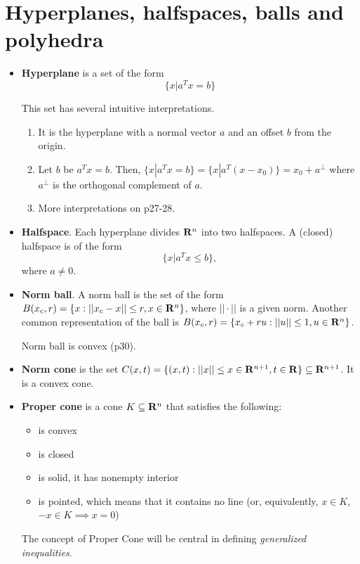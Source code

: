 \documentclass[a4paper, oneside]{book}
\begin{document}
\section{Hyperplanes, halfspaces, balls and polyhedra}
\begin{itemize}
\item \textbf{Hyperplane} is a set of the form $$\{x | a^T x = b\}$$

This set has several intuitive interpretations. 
	\begin{enumerate}
	\item It is the hyperplane with a normal vector $a$ and an offset $b$ from the origin.
	\item Let $b$ be $a^T x = b$. Then, $\{x | a^T x = b\} = \{x | a^T (x-x_0)\} = x_0 + a^\perp$ where $a^\perp$ is the orthogonal complement of $a$.
	\item More interpretations on p27-28.
	\end{enumerate}
\item \textbf{Halfspace}. Each hyperplane divides $\mathbf R^n$ into two halfspaces. A (closed) halfspace is of the form $$\{x | a^T x\le b\},$$
where $a \neq 0$.
\item \textbf{Norm ball}. A norm ball is the set of the form $B(x_c, r)=\{ x :  ||x_c-x||\le r, x\in \mathbf R^n \}$, where $||\cdot||$ is a given norm. Another common representation of the ball is $B(x_c, r) = \{x_c+ru : ||u|| \le 1, u \in \mathbf R^n \}$.

Norm ball is convex (p30).
\item \textbf{Norm cone} is the set $C(x,t)=\{(x,t) : ||x||\le  x\in \mathbf R^{n+1}, t \in \mathbf R\} \subseteq \mathbf R^{n+1}$. It is a convex cone.

\item \textbf{Proper cone} is a cone $K \subseteq \mathbf R^n$ that satisfies the following:
	\begin{itemize}
	\item is convex
	\item is closed
	\item is solid, \ie it has nonempty interior
	\item is pointed, which means that it contains no line (or, equivalently, $x\in K$, $-x\in K \implies x =0 $)
	\end{itemize}
	
The concept of Proper Cone will be central in defining \textit{generalized inequalities}.


\end{itemize}
\end{document}
